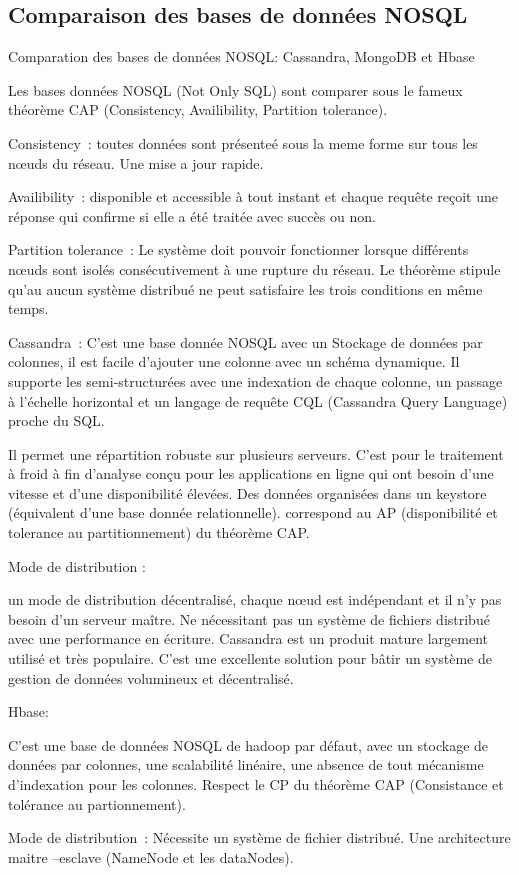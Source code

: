 \subsection{Comparaison des bases de données NOSQL}
Comparation des bases de données NOSQL: Cassandra, MongoDB et Hbase

Les bases données NOSQL (Not Only SQL) sont  comparer sous le fameux  théorème CAP (Consistency, Availibility, Partition tolerance). 

\item
Consistency : toutes données sont  présenteé sous la meme forme sur tous les nœuds du réseau. Une mise a jour rapide.
\item
Availibility : disponible et  accessible à tout instant et chaque requête reçoit une réponse qui confirme si elle a été traitée avec succès ou non.
\item
Partition tolerance : Le système doit pouvoir fonctionner lorsque différents nœuds sont isolés consécutivement à une rupture du réseau.
Le théorème  stipule qu’au aucun système distribué ne peut satisfaire les trois conditions  en même temps. 
\item Cassandra :
 C’est une base donnée NOSQL avec un Stockage de données par  colonnes, il est facile d’ajouter une colonne avec un schéma dynamique. Il supporte les semi-structurées avec une indexation de chaque colonne, un passage à l’échelle horizontal et un langage de requête CQL (Cassandra Query Language) proche du SQL.

Il permet une répartition robuste sur plusieurs serveurs. C’est pour le traitement à froid à fin d’analyse conçu pour les applications en ligne qui ont besoin d’une vitesse et d’une disponibilité élevées. Des données organisées dans un keystore (équivalent d’une base donnée relationnelle). correspond au AP (disponibilité et tolerance au partitionnement) du théorème CAP.
\item Mode de distribution : 

un mode de distribution décentralisé, chaque nœud est indépendant et il n’y pas besoin d’un serveur maître. Ne nécessitant  pas un système de fichiers distribué avec une performance en écriture. Cassandra est un produit mature largement utilisé et très populaire. C’est une excellente solution pour bâtir un système de gestion de données volumineux et décentralisé.  

\item  Hbase:

C’est une base de données NOSQL  de hadoop par défaut, avec un stockage de données par colonnes, une scalabilité linéaire, une absence de tout mécanisme d’indexation pour les colonnes. Respect le CP du théorème CAP (Consistance et tolérance au partionnement).
\item Mode de distribution : Nécessite un système de fichier distribué. Une architecture maitre –esclave (NameNode et les dataNodes).	 

